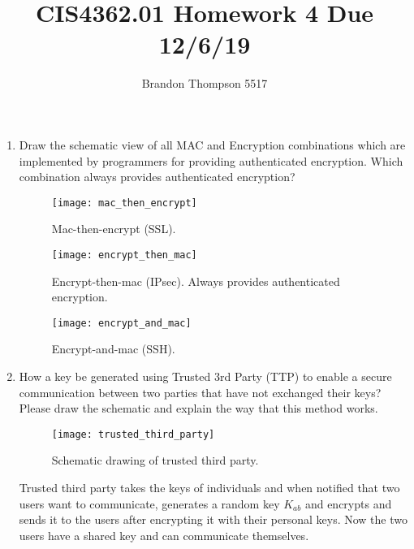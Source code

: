 \documentclass[a4paper]{article}
\begin{document}
	\title{CIS4362.01 Homework 4 Due 12/6/19}
	\author{Brandon Thompson 5517}
	\maketitle

	\begin{enumerate}
		\item Draw the schematic view of all MAC and Encryption combinations which are
			implemented by programmers for providing authenticated encryption.
			Which combination always provides authenticated encryption?
			
			\begin{figure}[ht!]
				\centering
				\texttt{[image: mac\_then\_encrypt]}
				\caption{Mac-then-encrypt (SSL).}
				\label{fig:mac_then_encrypt}
			\end{figure}

			\begin{figure}[ht!]
				\centering
				\texttt{[image: encrypt\_then\_mac]}
				\caption{Encrypt-then-mac (IPsec). Always provides authenticated encryption.}
				\label{fig:encrypt_then_mac}
			\end{figure}

			\begin{figure}[ht!]
				\centering
				\texttt{[image: encrypt\_and\_mac]}
				\caption{Encrypt-and-mac (SSH).}
				\label{fig:encrypt_and_mac}
			\end{figure}
			\clearpage
		\item How a key be generated using Trusted 3rd Party (TTP) to enable a secure
			communication between two parties that have not exchanged their keys?
			Please draw the schematic and explain the way that this method works.
			\begin{figure}[ht!]
				\centering
				\texttt{[image: trusted\_third\_party]}
				\caption{Schematic drawing of trusted third party.}
				\label{fig:trusted_third_party}
			\end{figure}
			
			Trusted third party takes the keys of individuals and when notified that
			two users want to communicate, generates a random key $K_{ab}$ and encrypts
			and sends it to the users after encrypting it with their personal keys.
			Now the two users have a shared key and can communicate themselves.
		

\end{enumerate}
\end{document}
